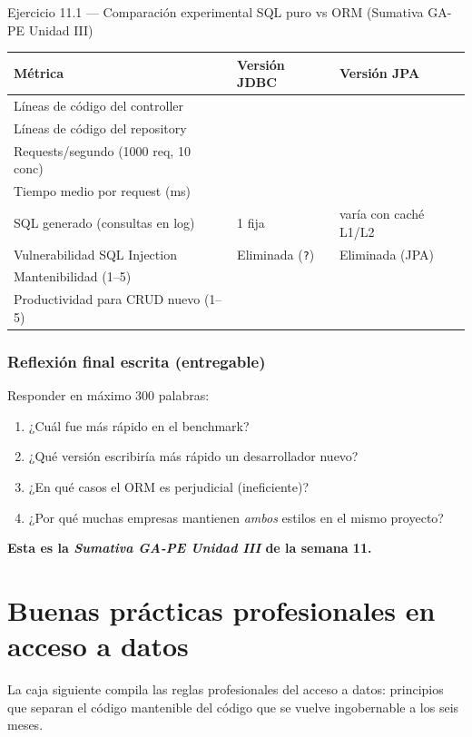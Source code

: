\documentclass[11pt,a4paper,openany]{book}
\begin{document}
\begin{cajaejercicio}{Ejercicio 11.1 --- Comparación experimental SQL puro vs ORM (Sumativa GA-PE Unidad III)}
\begin{tabularx}{\textwidth}{Xll}
\toprule
\textbf{Métrica} & \textbf{Versión JDBC} & \textbf{Versión JPA}\\
\midrule
Líneas de código del controller & & \\
Líneas de código del repository & & \\
Requests/segundo (1000 req, 10 conc) & & \\
Tiempo medio por request (ms) & & \\
SQL generado (consultas en log) & 1 fija & varía con caché L1/L2 \\
Vulnerabilidad SQL Injection & Eliminada (\texttt{?}) & Eliminada (JPA) \\
Mantenibilidad (1--5) & & \\
Productividad para CRUD nuevo (1--5) & & \\
\bottomrule
\end{tabularx}

\subsubsection*{Reflexión final escrita (entregable)}

Responder en máximo 300 palabras:
\begin{enumerate}
\item ¿Cuál fue más rápido en el benchmark?
\item ¿Qué versión escribiría más rápido un desarrollador nuevo?
\item ¿En qué casos el ORM es perjudicial (ineficiente)?
\item ¿Por qué muchas empresas mantienen \emph{ambos} estilos en el
mismo proyecto?
\end{enumerate}

\textbf{Esta es la \emph{Sumativa GA-PE Unidad III} de la semana 11.}
\end{cajaejercicio}

\section{Buenas prácticas profesionales en acceso a datos}

La caja siguiente compila las reglas profesionales del
acceso a datos: principios que separan el código mantenible del
código que se vuelve ingobernable a los seis meses.
\end{document}
